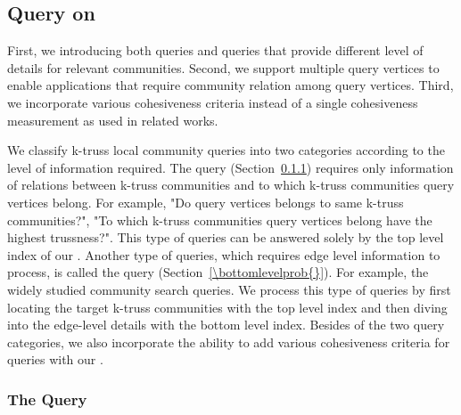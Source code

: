 \subsection{Query on \TwoLevelIndex{}}
\label{query}

First, we introducing both \toplevelprob{} queries and \bottomlevelprob{} queries that provide different level of details for relevant communities. Second, we support multiple query vertices to enable applications that require community relation among query vertices. Third, we incorporate various cohesiveness criteria instead of a single cohesiveness measurement as used in related works.

We classify k-truss local community queries into two categories according to the level of information required. The \toplevelprob{} query (Section~\ref{\toplevelprob{}}) requires only information of relations between k-truss communities and to which k-truss communities query vertices belong. For example, "Do query vertices belongs to same k-truss communities?", "To which k-truss communities query vertices belong have the highest trussness?". This type of queries can be answered solely by the top level index of our \twolevelindex{}. Another type of queries, which requires edge level information to process, is called the \bottomlevelprob{} query (Section~\ref{\bottomlevelprob{}}). For example, the widely studied community search queries. We process this type of queries by first locating the target k-truss communities with the top level index and then diving into the edge-level details with the bottom level index. Besides of the two query categories, we also incorporate the ability to add various cohesiveness criteria for queries with our \twolevelindex{}.

\subsubsection{The \TopLevelProb{} Query}
\label{\toplevelprob{}}

